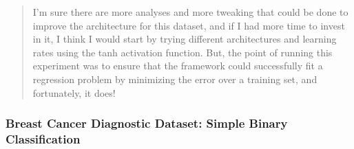 \documentclass{article}
\begin{document}
\begin{quote}
	 I'm sure there are more analyses and more tweaking that could be done to improve the architecture for this dataset, and if I had more time to invest in it, I think I would start by trying different architectures and learning rates using the tanh activation function. But, the point of running this experiment was to ensure that the framework could successfully fit a regression problem by minimizing the error over a training set, and fortunately, it does!
	 
	 
	 
\end{quote}

\subsubsection*{Breast Cancer Diagnostic Dataset: Simple Binary Classification}
\end{document}
